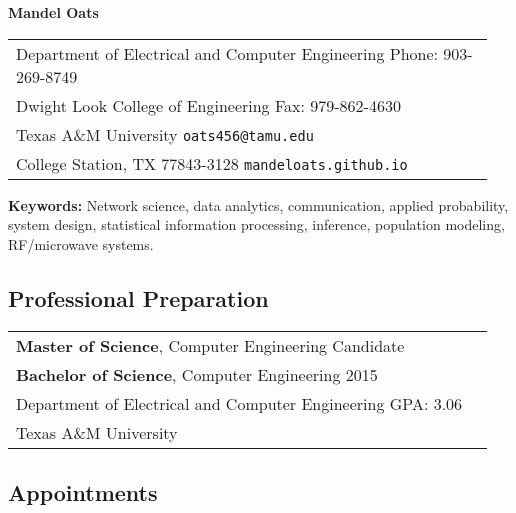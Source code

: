 \newpage

\begin{center}
{\bfseries \Large Mandel Oats}
\end{center}

\begin{center}
\begin{tabular}{p{0.95\linewidth}}
Department of Electrical and Computer Engineering
\hfill Phone: 903-269-8749 \\
Dwight Look College of Engineering
\hfill Fax: 979-862-4630 \\
Texas A\&M University
\hfill \texttt{oats456@tamu.edu} \\
College Station, TX 77843-3128
\hfill \texttt{mandeloats.github.io}
\end{tabular}
\end{center}

\textbf{Keywords:} Network science, data analytics, communication, applied probability, system design, statistical information processing, inference, population modeling, RF/microwave systems.

\subsection*{Professional Preparation}

\begin{center}
\begin{tabular}{p{0.95\linewidth}}
\textbf{Master of Science}, Computer Engineering \hfill Candidate \\
\textbf{Bachelor of Science}, Computer Engineering  \hfill 2015 \\
Department of Electrical and Computer Engineering \hfill GPA: 3.06\\
Texas A\&M University
\end{tabular}
\end{center}

\subsection*{Appointments}

